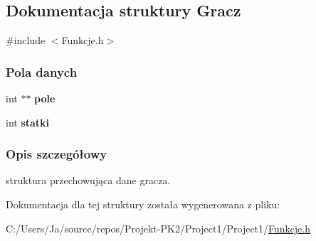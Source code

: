\hypertarget{structGracz}{}\subsection{Dokumentacja struktury Gracz}
\label{structGracz}


{\ttfamily \#include $<$Funkcje.\+h$>$}

\subsubsection*{Pola danych}
\begin{DoxyCompactItemize}
\item 
\mbox{\label{structGracz_acdeac9175b902ddfa4b0d33aa24f591f}} 
int $\ast$$\ast$ {\bfseries pole}
\item 
\mbox{\label{structGracz_a9be08d404273a39a4f04a8df52928b60}} 
int {\bfseries statki}
\end{DoxyCompactItemize}


\subsubsection{Opis szczegółowy}
struktura przechowująca dane gracza. 

Dokumentacja dla tej struktury została wygenerowana z pliku\+:\begin{DoxyCompactItemize}
\item 
C\+:/\+Users/\+Ja/source/repos/\+Projekt-\/\+P\+K2/\+Project1/\+Project1/\mbox{\hyperlink{Funkcje_8h}{Funkcje.\+h}}\end{DoxyCompactItemize}
